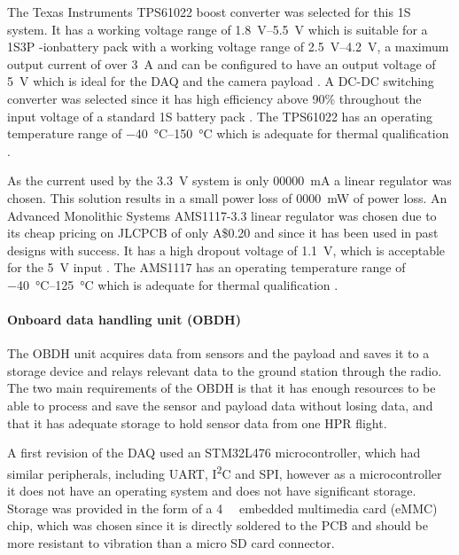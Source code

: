 \documentclass[a4paper,11pt]{article}
\newcommand{\liion}{\ce{Li}-ion}
\newcommand{\aud}{A\$}
\begin{document}
The Texas Instruments TPS61022 boost converter was selected for this 1S system. It has a working voltage range of \SIrange{1.8}{5.5}{\volt} which is suitable for a 1S3P \liion battery pack with a working voltage range of \SIrange{2.5}{4.2}{\volt}, a maximum output current of over \SI{3}{\ampere} and can be configured to have an output voltage of \SI{5}{\volt} which is ideal for the DAQ and the camera payload \cite{ti2021tps61022}. A DC-DC switching converter was selected since it has high efficiency above 90\% throughout the input voltage of a standard 1S battery pack \cite{ti2021tps61022}. The TPS61022 has an operating temperature range of \SIrange{-40}{150}{\degreeCelsius} which is adequate for thermal qualification \cite{ti2021tps61022}.

As the current used by the \SI{3.3}{\volt} system is only \SI{00000}{\milli\ampere} a linear regulator was chosen. This solution results in a small power loss of \SI{0000}{\milli\watt} of power loss. %
An Advanced Monolithic Systems AMS1117-3.3 linear regulator was chosen due to its cheap pricing on JLCPCB of only \aud 0.20 and since it has been used in past designs with success. It has a high dropout voltage of \SI{1.1}{\volt}, which is acceptable for the \SI{5}{\volt} input \cite{ams2007ams1117}. The AMS1117 has an operating temperature range of \SIrange{-40}{125}{\degreeCelsius} which is adequate for thermal qualification \cite{ams2007ams1117}.

\paragraph{Onboard data handling unit (OBDH)}

The OBDH unit acquires data from sensors and the payload and saves it to a storage device and relays relevant data to the ground station through the radio. The two main requirements of the OBDH is that it has enough resources to be able to process and save the sensor and payload data without losing data, and that it has adequate storage to hold sensor data from one HPR flight.

A first revision of the DAQ used an STM32L476 microcontroller, which had similar peripherals, including UART, I\textsuperscript{2}C and SPI, however as a microcontroller it does not have an operating system and does not have significant storage. Storage was provided in the form of a \SI{4}{\giga\byte} embedded multimedia card (eMMC) chip, which was chosen since it is directly soldered to the PCB and should be more resistant to vibration than a micro SD card connector.
\end{document}
